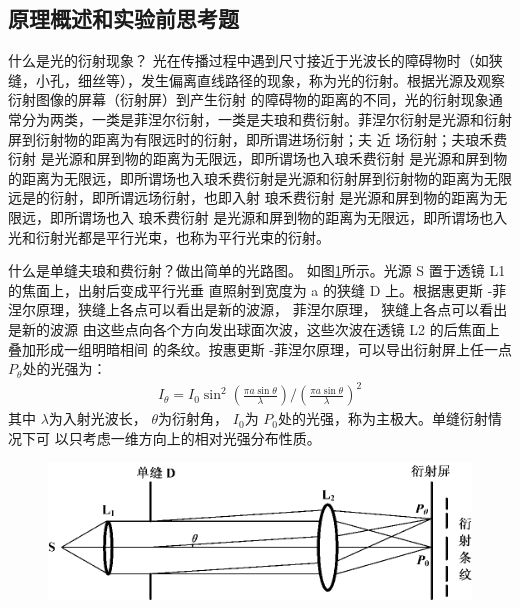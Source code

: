 \documentclass[dvipsnames, svgnames,a4paper,11pt]{article}
\begin{document}
\subsection{原理概述和实验前思考题}
\begin{question}
    什么是光的衍射现象？
    \tcblower
    光在传播过程中遇到尺寸接近于光波长的障碍物时（如狭缝，小孔，细丝等），发生偏离直线路径的现象，称为光的衍射。根据光源及观察衍射图像的屏幕（衍射屏）到产生衍射
    的障碍物的距离的不同，光的衍射现象通常分为两类，一类是菲涅尔衍射，一类是夫琅和费衍射。菲涅尔衍射是光源和衍射屏到衍射物的距离为有限远时的衍射，即所谓进场衍射；夫 近
    场衍射；夫琅禾费衍射 是光源和屏到物的距离为无限远，即所谓场也入琅禾费衍射 是光源和屏到物的距离为无限远，即所谓场也入琅禾费衍射是光源和衍射屏到衍射物的距离为无限远是的衍射，即所谓远场衍射，也即入射 琅禾费衍射 是光源和屏到物的距离为无限远，即所谓场也入
    琅禾费衍射 是光源和屏到物的距离为无限远，即所谓场也入光和衍射光都是平行光束，也称为平行光束的衍射。
\end{question}

\begin{question}
    什么是单缝夫琅和费衍射？做出简单的光路图。
    \tcblower
    如图\ref{1}所示。光源 S 置于透镜 L1 的焦面上，出射后变成平行光垂
直照射到宽度为 a 的狭缝 D 上。根据惠更斯 -菲涅尔原理，狭缝上各点可以看出是新的波源， 菲涅尔原理， 狭缝上各点可以看出是新的波源
由这些点向各个方向发出球面次波，这些次波在透镜 L2 的后焦面上叠加形成一组明暗相间
的条纹。按惠更斯 -菲涅尔原理，可以导出衍射屏上任一点 $P_\theta$处的光强为：
\begin{align*}
    I_\theta=I_0\sin^2\left(\frac{\pi a\sin\theta}{\lambda}\right)/\left(\frac{\pi a\sin\theta}{\lambda}\right)^2
\end{align*}
其中 $\lambda$为入射光波长， $\theta$为衍射角， $I_0$为 $P_0$处的光强，称为主极大。单缝衍射情况下可
以只考虑一维方向上的相对光强分布性质。
\begin{figure}[H]
    \label{1}
    \includegraphics[width=\textwidth]{夫琅禾费光路图.png}
\end{figure}
\end{question}
\end{document}
